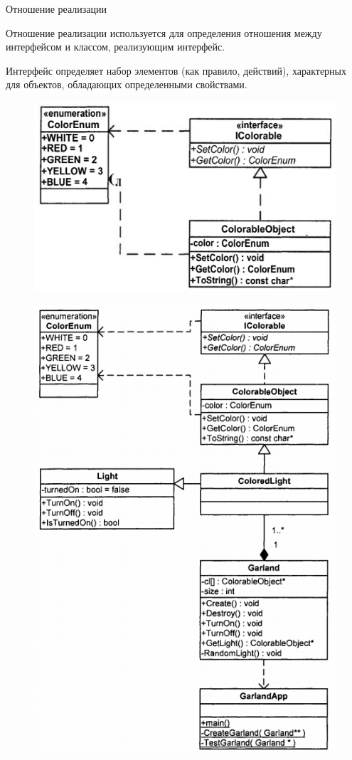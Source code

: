 \documentclass{beamer}
\begin{document}
\begin{frame}{Отношение реализации}
\begin{block}{Отношение реализации}
используется для определения отношения между интерфейсом и классом, реализующим интерфейс.
\end{block}
Интерфейс определяет набор элементов (как правило, действий), характерных для объектов, обладающих определенными свойствами.
\begin{figure}[h]
\centering
\includegraphics[scale=0.5]{images/lec04-pic19.png}
\end{figure}
\end{frame}

\begin{frame}
\begin{figure}[h]
\centering
\includegraphics[scale=0.45]{images/lec04-pic21.png}
\end{figure}
\end{frame}
\end{document}
